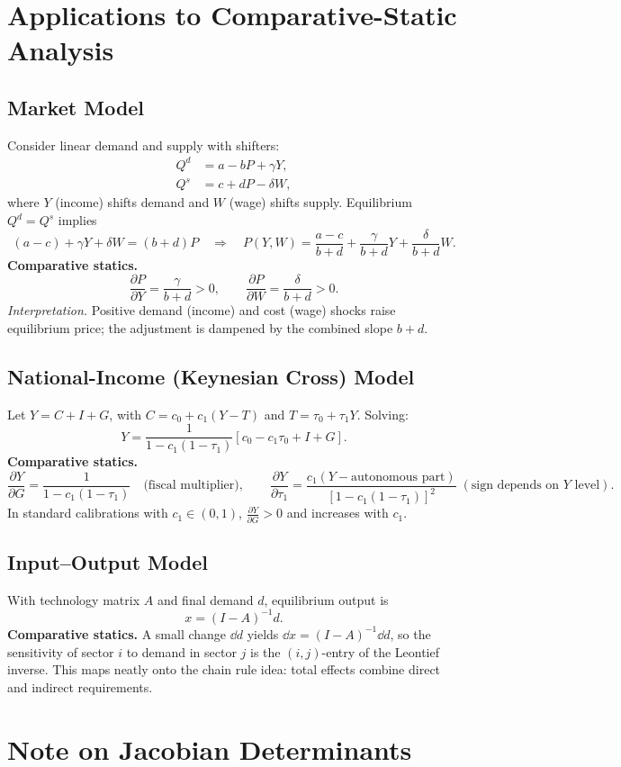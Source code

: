 \documentclass[11pt]{article}
\newcommand{\pd}[2]{\frac{\partial #1}{\partial #2}}
\begin{document}
\section{Applications to Comparative-Static Analysis}

\subsection*{Market Model}
Consider linear demand and supply with shifters:
\begin{align*}
Q^d &= a - bP + \gamma Y,\\
Q^s &= c + dP - \delta W,
\end{align*}
where $Y$ (income) shifts demand and $W$ (wage) shifts supply. Equilibrium $Q^d=Q^s$ implies
\[
(a-c)+\gamma Y+\delta W=(b+d)P \quad\Rightarrow\quad 
P(Y,W)=\frac{a-c}{b+d}+\frac{\gamma}{b+d}Y+\frac{\delta}{b+d}W.
\]
\textbf{Comparative statics.}
\[
\pd{P}{Y}=\frac{\gamma}{b+d}>0,\qquad 
\pd{P}{W}=\frac{\delta}{b+d}>0.
\]
\textit{Interpretation.} Positive demand (income) and cost (wage) shocks raise equilibrium price; the adjustment is dampened by the combined slope $b+d$.

\subsection*{National-Income (Keynesian Cross) Model}
Let $Y=C+I+G$, with $C=c_0+c_1(Y-T)$ and $T=\tau_0+\tau_1 Y$.
Solving: 
\[
Y=\frac{1}{1-c_1(1-\tau_1)}\left[c_0-c_1\tau_0+I+G\right].
\]
\textbf{Comparative statics.}
\[
\pd{Y}{G}=\frac{1}{1-c_1(1-\tau_1)} \quad\text{(fiscal multiplier)},\qquad
\pd{Y}{\tau_1}=\frac{c_1(Y-\text{autonomous part})}{[1-c_1(1-\tau_1)]^2}\;(\text{sign depends on $Y$ level}).
\]
In standard calibrations with $c_1\in(0,1)$, $\pd{Y}{G}>0$ and increases with $c_1$.

\subsection*{Input--Output Model}
With technology matrix $A$ and final demand $d$, equilibrium output is
\[
x=(I-A)^{-1} d.
\]
\textbf{Comparative statics.} A small change $\dd d$ yields $\dd x=(I-A)^{-1}\dd d$, so the sensitivity of sector $i$ to demand in sector $j$ is the $(i,j)$-entry of the Leontief inverse. This maps neatly onto the chain rule idea: total effects combine direct and indirect requirements.

\section{Note on Jacobian Determinants}
\end{document}
